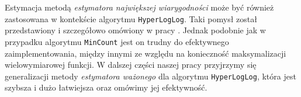        Estymacja metodą \textit{estymatora największej wiarygodności} może być również zastosowana w kontekście algorytmu \texttt{HyperLogLog}. Taki pomysł został przedstawiony i szczegółowo omówiony w pracy \cite{oertl}. Jednak podobnie jak w przypadku algorytmu \texttt{MinCount} jest on trudny do efektywnego zaimplementowania, między innymi ze względu na konieczność maksymalizacji wielowymiarowej funkcji. W dalszej części naszej pracy przyjrzymy się generalizacji metody \textit{estymatora ważonego} dla algorytmu \texttt{HyperLogLog}, która jest szybsza i dużo łatwiejsza oraz omówimy jej efektywność.
  
